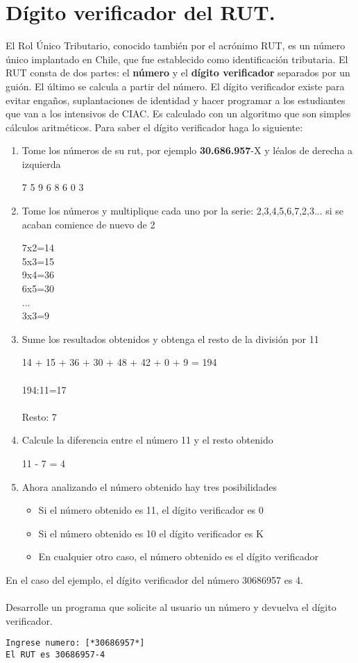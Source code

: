 \section{Dígito verificador del RUT.}

El Rol Único Tributario, conocido también por el acrónimo RUT, es un número único implantado en Chile, que fue establecido como identificación tributaria. El RUT consta de dos partes: el \textbf{número} y el \textbf{dígito verificador} separados por un guión. El último se calcula a partir del número. El dígito verificador existe para evitar engaños, suplantaciones de identidad y hacer programar a los estudiantes que van a los intensivos de CIAC. Es calculado con un algoritmo que son simples cálculos aritméticos. Para saber el dígito verificador haga lo siguiente:
\begin{enumerate}
    \item Tome los números de su rut, por ejemplo \textbf{30.686.957}-X y léalos de derecha a izquierda
    \begin{center}
    7 5 9 6 8 6 0 3
    \end{center}
    \item Tome los números y multiplique cada uno por la serie: 2,3,4,5,6,7,2,3... si se acaban comience de nuevo de 2
    \begin{center}
    7x2=14\\5x3=15\\9x4=36\\6x5=30\\...\\3x3=9
    \end{center}
    \item Sume los resultados obtenidos y obtenga el resto de la división por 11
    \begin{center}
    14 + 15 + 36 + 30 + 48 + 42 + 0 + 9 = 194\\ \\ 194:11=17\\ \\Resto: 7
    \end{center}
    \item Calcule la diferencia entre el número 11 y el resto obtenido
    \begin{center}
    11 - 7 = 4
    \end{center}
    \item Ahora analizando el número obtenido hay tres posibilidades
    \begin{itemize}
        \item Si el número obtenido es 11, el dígito verificador es 0
        \item Si el número obtenido es 10 el dígito verificador es K
        \item En cualquier otro caso, el número obtenido es el dígito verificador
    \end{itemize}
\end{enumerate}

En el caso del ejemplo, el dígito verificador del número 30686957 es 4.
\\ \\
Desarrolle un programa que solicite al usuario un número y devuelva el dígito verificador.
\begin{lstlisting}[style=consola]
Ingrese numero: [*30686957*]
El RUT es 30686957-4
\end{lstlisting}